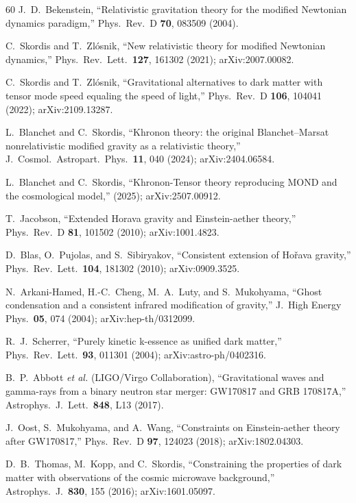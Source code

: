 \documentclass[prd,twocolumn,superscriptaddress,longbibliography,floatfix]{revtex4-2}
\begin{document}
\begin{thebibliography}{60}
J.~D.~Bekenstein,
``Relativistic gravitation theory for the modified Newtonian
dynamics paradigm,''
Phys.\ Rev.\ D \textbf{70}, 083509 (2004).

C.~Skordis and T.~Zl\'{o}snik,
``New relativistic theory for modified Newtonian dynamics,''
Phys.\ Rev.\ Lett.\ \textbf{127}, 161302 (2021);
arXiv:2007.00082.

C.~Skordis and T.~Zl\'{o}snik,
``Gravitational alternatives to dark matter with tensor mode
speed equaling the speed of light,''
Phys.\ Rev.\ D \textbf{106}, 104041 (2022);
arXiv:2109.13287.

L.~Blanchet and C.~Skordis,
``Khronon theory: the original Blanchet--Marsat nonrelativistic
modified gravity as a relativistic theory,''
J.\ Cosmol.\ Astropart.\ Phys.\ \textbf{11}, 040 (2024);
arXiv:2404.06584.

L.~Blanchet and C.~Skordis,
``Khronon-Tensor theory reproducing MOND and the cosmological model,''
(2025); arXiv:2507.00912.

T.~Jacobson,
``Extended Horava gravity and Einstein-aether theory,''
Phys.\ Rev.\ D \textbf{81}, 101502 (2010);
arXiv:1001.4823.

D.~Blas, O.~Pujolas, and S.~Sibiryakov,
``Consistent extension of Ho\v{r}ava gravity,''
Phys.\ Rev.\ Lett.\ \textbf{104}, 181302 (2010);
arXiv:0909.3525.

N.~Arkani-Hamed, H.-C.~Cheng, M.~A.~Luty, and S.~Mukohyama,
``Ghost condensation and a consistent infrared modification
of gravity,''
J.\ High Energy Phys.\ \textbf{05}, 074 (2004);
arXiv:hep-th/0312099.

R.~J.~Scherrer,
``Purely kinetic k-essence as unified dark matter,''
Phys.\ Rev.\ Lett.\ \textbf{93}, 011301 (2004);
arXiv:astro-ph/0402316.

B.~P.~Abbott \emph{et al.} (LIGO/Virgo Collaboration),
``Gravitational waves and gamma-rays from a binary neutron star
merger: GW170817 and GRB 170817A,''
Astrophys.\ J.\ Lett.\ \textbf{848}, L13 (2017).

J.~Oost, S.~Mukohyama, and A.~Wang,
``Constraints on Einstein-aether theory after GW170817,''
Phys.\ Rev.\ D \textbf{97}, 124023 (2018);
arXiv:1802.04303.

D.~B.~Thomas, M.~Kopp, and C.~Skordis,
``Constraining the properties of dark matter with observations
of the cosmic microwave background,''
Astrophys.\ J.\ \textbf{830}, 155 (2016);
arXiv:1601.05097.


\end{thebibliography}
\end{document}
